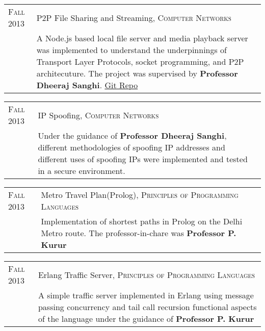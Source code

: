 \documentclass[a4paper,10pt]{article} %
\begin{document}
\begin{tabular}{p{2.2cm}|p{11cm}}
    \textsc{Fall 2013} & P2P File Sharing and Streaming, \textsc{Computer Networks} \\
                       & \footnotesize{A Node.js based local file server and media playback server was implemented
                          to understand the underpinnings of Transport Layer Protocols, socket programming,
                          and P2P architecuture.  The project was supervised by \textbf{Professor Dheeraj Sanghi}.
                          \href{https://github.com/srijanshetty/nodesock} {Git Repo}}\\
\end{tabular}

\begin{tabular}{p{2.2cm}|p{11cm}}
    \textsc{Fall 2013} & IP Spoofing, \textsc{Computer Networks} \\
                       & \footnotesize{Under the guidance of \textbf{Professor Dheeraj Sanghi}, different methodologies
                          of spoofing IP addresses and different uses of spoofing IPs were implemented and tested
                          in a secure environment.}\\
\end{tabular}

\begin{tabular}{p{2.2cm}|p{11cm}}
    \textsc{Fall 2013} & Metro Travel Plan(Prolog), \textsc{Principles of Programming Languages} \\
                       & \footnotesize{Implementation of shortest paths in Prolog on the Delhi Metro route.
                          The professor-in-chare was \textbf{Professor P. Kurur}}\\
\end{tabular}

\begin{tabular}{p{2.2cm}|p{11cm}}
    \textsc{Fall 2013} & Erlang Traffic Server, \textsc{Principles of Programming Languages} \\
                       & \footnotesize{A simple traffic server implemented in Erlang using message passing
                          concurrency and tail call recursion functional aspects of the language under the
                          guidance of \textbf{Professor P. Kurur}}\\
\end{tabular}
\end{document}
